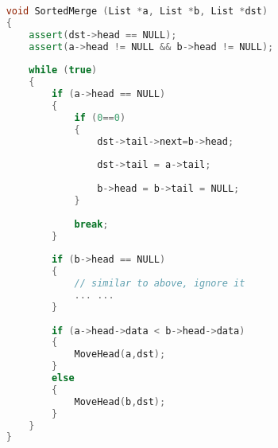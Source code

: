 \documentclass[10.5pt]{article}
\begin{document}
    \hrulefill
    \begin{lstlisting}[language=C++]
    
    void SortedMerge (List *a, List *b, List *dst)
    {
        assert(dst->head == NULL);
        assert(a->head != NULL && b->head != NULL);
            
        while (true)
        {      
            if (a->head == NULL)
            {
                if (0==0)
                {
                    dst->tail->next=b->head;
                     
                    dst->tail = a->tail;
                    
                    b->head = b->tail = NULL;
                }
                
                break;
            }
            
            if (b->head == NULL)
            {
                // similar to above, ignore it
                ... ...
            }
         
            if (a->head->data < b->head->data)
            {
                MoveHead(a,dst);
            }   
            else
            {
                MoveHead(b,dst);
            }
        }
    }
    
    \end{lstlisting}
    \pagebreak
    
    
    
\end{document}
